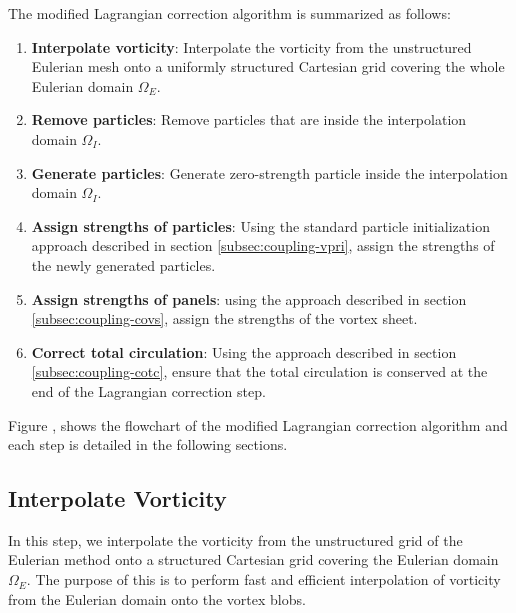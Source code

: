 	The modified Lagrangian correction algorithm is summarized as follows:
	\begin{enumerate}
	\item \textbf{Interpolate vorticity}: Interpolate the vorticity from the unstructured Eulerian mesh onto a uniformly structured Cartesian grid covering the whole Eulerian domain $\Omega_E$.
	\item \textbf{Remove particles}: Remove particles that are inside the interpolation domain $\Omega_{I}$.
	\item \textbf{Generate particles}: Generate zero-strength particle inside the interpolation domain $\Omega_{I}$.
	\item \textbf{Assign strengths of particles}: Using the standard particle initialization approach described in section \ref{subsec:coupling-vpri}, assign the strengths of the newly generated particles. 
	\item \textbf{Assign strengths of panels}: using the approach described in section \ref{subsec:coupling-covs}, assign the strengths of the vortex sheet.
	\item \textbf{Correct total circulation}: Using the approach described in section \ref{subsec:coupling-cotc}, ensure that the total circulation is conserved at the end of the Lagrangian correction step.
	\end{enumerate}
	
	Figure , shows the flowchart of the modified Lagrangian correction algorithm and each step is detailed in the following sections.
	
	
	\subsection{Interpolate Vorticity}
	In this step, we interpolate the vorticity from the unstructured grid of the Eulerian method onto a structured Cartesian grid covering the Eulerian domain $\Omega_E$. The purpose of this is to perform fast and efficient interpolation of vorticity from the Eulerian domain onto the vortex blobs.
	
